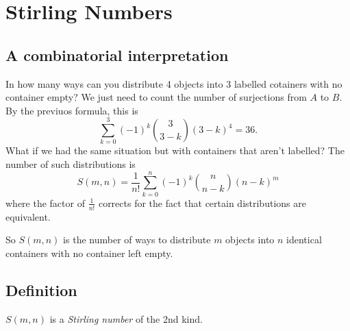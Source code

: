 \documentclass[11pt]{article}
\begin{document}
    \section{Stirling Numbers}

    \subsection{A combinatorial interpretation}

    In how many ways can you distribute 4 objects into 3 labelled cotainers with no container empty?
    We just need to count the number of surjections from $A$ to $B$. By the previuos formula, this is \[\sum_{k = 0}^{3} (-1)^k \binom{3}{3-k} (3-k)^4 = 36.\] What if we had the same situation but with containers that aren't labelled? The number of such distributions is \[S(m,n) = \frac{1}{n!} \sum_{k=0}^n (-1)^k \binom{n}{n-k} (n-k)^m\] where the factor of \(\frac{1}{n!}\) corrects for the fact that certain distributions are equivalent.

    So \(S(m,n)\) is the number of ways to distribute $m$ objects into $n$ identical containers with no container left empty. 

    \subsection{Definition}

    \(S(m,n)\) is a \emph{Stirling number} of the 2nd kind.
    
\end{document}
